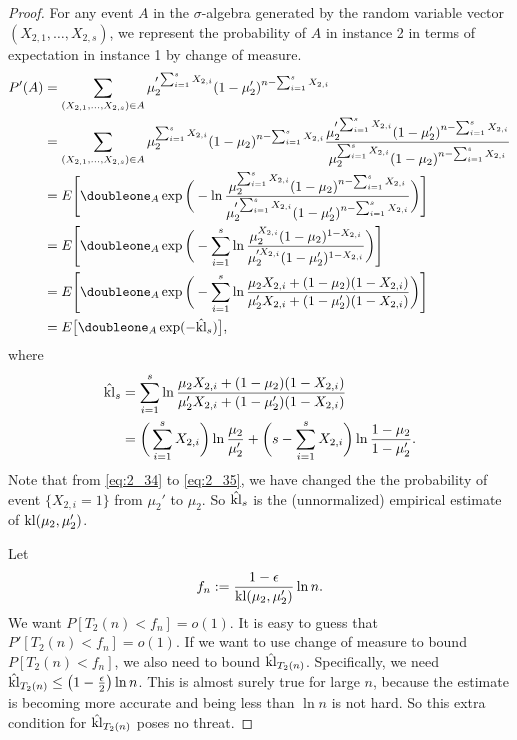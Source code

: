 \begin{proof}
    For any event $A$ in the $\sigma$-algebra generated by the random variable vector
    $(X_{2,1}, \dots, X_{2,s})$,
    we represent the probability of $A$ in instance 2 in terms of
    expectation in instance 1 by change of measure.
    \begin{align}
        P'(A)
            &= \sum_{(X_{2,1},\dots,X_{2,s})\in A}
                \mu_2'^{\sum_{i=1}^s X_{2,i}}(1-\mu_2')^{n-\sum_{i=1}^s X_{2,i}} \label{eq:2_34} \\
            &= \sum_{(X_{2,1},\dots,X_{2,s})\in A}
                \mu_2^{\sum_{i=1}^s X_{2,i}}(1-\mu_2)^{n-\sum_{i=1}^s X_{2,i}}
                \frac{\mu_2'^{\sum_{i=1}^s X_{2,i}}(1-\mu_2')^{n-\sum_{i=1}^s X_{2,i}}}
                {\mu_2^{\sum_{i=1}^s X_{2,i}}(1-\mu_2)^{n-\sum_{i=1}^s X_{2,i}}} \label{eq:2_35} \\
            &= E\Bigg[\doubleone_A \exp\bigg(-\ln
                \frac{\mu_2^{\sum_{i=1}^s X_{2,i}}(1-\mu_2)^{n-\sum_{i=1}^s X_{2,i}}}
                {\mu_2'^{\sum_{i=1}^s X_{2,i}}(1-\mu_2')^{n-\sum_{i=1}^s X_{2,i}}}\bigg)\Bigg] \\
            &= E\Bigg[\doubleone_A \exp\bigg(-\sum_{i=1}^s \ln
                \frac{\mu_2^{X_{2,i}}(1-\mu_2)^{1-X_{2,i}}}
                {\mu_2'^{X_{2,i}}(1-\mu_2')^{1-X_{2,i}}}\bigg)\Bigg] \\
            &= E\Bigg[\doubleone_A \exp\bigg(-\sum_{i=1}^s \ln
                \frac{\mu_2 X_{2,i} + (1-\mu_2) (1-X_{2,i})}
                {\mu_2' X_{2,i} + (1-\mu_2')(1-X_{2,i})}\bigg)\Bigg] \\
            &= E\big[\doubleone_A \exp(-\hat\kl_s)\big],
    \end{align}
    where
    \begin{align}
        \hat{{\mathop{\mathrm{kl}}}}_s
            &= \sum_{i=1}^s \ln
                \frac{\mu_2 X_{2,i} + (1-\mu_2) (1-X_{2,i})}
                {\mu_2' X_{2,i} + (1-\mu_2')(1-X_{2,i})} \\
            &= \bigg(\sum_{i=1}^s X_{2,i}\bigg)\ln\frac{\mu_2}{\mu_2'} +
                \bigg(s-\sum_{i=1}^s X_{2,i}\bigg)\ln\frac{1-\mu_2}{1-\mu_2'}.
    \end{align}
    Note that from \eqref{eq:2_34} to \eqref{eq:2_35},
    we have changed the the probability of event $\{X_{2,i}=1\}$ from $\mu_2'$ to $\mu_2$.
    So $\hat{{\mathop{\mathrm{kl}}}}_s$ is the (unnormalized) empirical estimate of ${\mathop{\mathrm{kl}}}(\mu_2,\mu_2')$.

    Let
    \begin{equation}
        f_n:=\frac{1-\epsilon}{{\mathop{\mathrm{kl}}}(\mu_2,\mu_2')}\ln n.
    \end{equation}
    We want $P[T_2(n)<f_n]=o(1)$.
    It is easy to guess that $P'[T_2(n)<f_n]=o(1)$.
    If we want to use change of measure to bound $P[T_2(n)<f_n]$,
    we also need to bound $\hat{{\mathop{\mathrm{kl}}}}_{T_2(n)}$.
    Specifically, we need $\hat{{\mathop{\mathrm{kl}}}}_{T_2(n)} \le \big(1-\frac{\epsilon}{2}\big)\ln n$.
    This is almost surely true for large $n$,
    because the estimate is becoming more accurate
    and being less than $\ln n$ is not hard.
    So this extra condition for $\hat{{\mathop{\mathrm{kl}}}}_{T_2(n)}$ poses no threat.


\end{proof}

